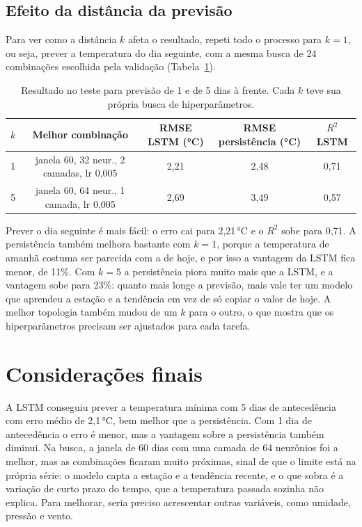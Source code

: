 \documentclass[11pt,a4paper]{article}
\begin{document}
\subsection*{Efeito da distância da previsão}

Para ver como a distância $k$ afeta o resultado, repeti todo o processo para $k=1$, ou seja, prever a temperatura do
dia seguinte, com a mesma busca de 24 combinações escolhida pela validação (Tabela~\ref{tab:k}).

\begin{table}[H]
\centering
\caption{Resultado no teste para previsão de 1 e de 5 dias à frente. Cada $k$ teve sua própria busca de hiperparâmetros.}
\label{tab:k}
\begin{tabular}{ccccc}
\toprule
$k$ & Melhor combinação & RMSE LSTM (°C) & RMSE persistência (°C) & $R^2$ LSTM\\
\midrule
1 & janela 60, 32 neur., 2 camadas, lr 0,005 & 2,21 & 2,48 & 0,71\\
5 & janela 60, 64 neur., 1 camada, lr 0,005 & 2,69 & 3,49 & 0,57\\
\bottomrule
\end{tabular}
\end{table}

Prever o dia seguinte é mais fácil: o erro cai para 2,21\,°C e o $R^2$ sobe para 0,71. A persistência também melhora
bastante com $k=1$, porque a temperatura de amanhã costuma ser parecida com a de hoje, e por isso a vantagem da LSTM
fica menor, de 11\%. Com $k=5$ a persistência piora muito mais que a LSTM, e a vantagem sobe para 23\%: quanto mais
longe a previsão, mais vale ter um modelo que aprendeu a estação e a tendência em vez de só copiar o valor de hoje. A
melhor topologia também mudou de um $k$ para o outro, o que mostra que os hiperparâmetros precisam ser ajustados para
cada tarefa.

\section{Considerações finais}

A LSTM conseguiu prever a temperatura mínima com 5 dias de antecedência com erro médio de 2,1\,°C, bem melhor que a
persistência. Com 1 dia de antecedência o erro é menor, mas a vantagem sobre a persistência também diminui. Na busca, a janela de 60 dias com uma camada de 64 neurônios foi a melhor, mas as combinações ficaram
muito próximas, sinal de que o limite está na própria série: o modelo capta a estação e a tendência recente, e o que
sobra é a variação de curto prazo do tempo, que a temperatura passada sozinha não explica. Para melhorar, seria
preciso acrescentar outras variáveis, como umidade, pressão e vento.
\end{document}
